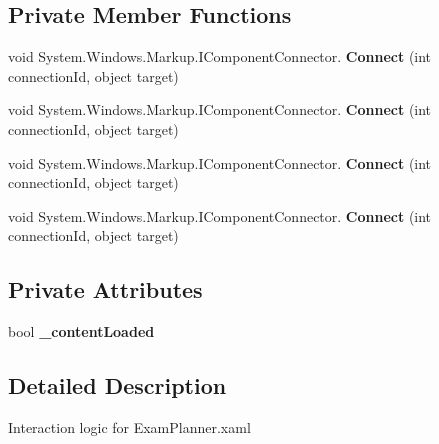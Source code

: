 \subsection*{Private Member Functions}
\begin{DoxyCompactItemize}
\item 
\mbox{\label{class_t_h_b___plugin___exams_1_1_exams_planner_1_1_page_aafa44a3d35e97d6ec9bc6c365ce75790}} 
void System.\+Windows.\+Markup.\+I\+Component\+Connector. {\bfseries Connect} (int connection\+Id, object target)
\item 
\mbox{\label{class_t_h_b___plugin___exams_1_1_exams_planner_1_1_page_aafa44a3d35e97d6ec9bc6c365ce75790}} 
void System.\+Windows.\+Markup.\+I\+Component\+Connector. {\bfseries Connect} (int connection\+Id, object target)
\item 
\mbox{\label{class_t_h_b___plugin___exams_1_1_exams_planner_1_1_page_aafa44a3d35e97d6ec9bc6c365ce75790}} 
void System.\+Windows.\+Markup.\+I\+Component\+Connector. {\bfseries Connect} (int connection\+Id, object target)
\item 
\mbox{\label{class_t_h_b___plugin___exams_1_1_exams_planner_1_1_page_aafa44a3d35e97d6ec9bc6c365ce75790}} 
void System.\+Windows.\+Markup.\+I\+Component\+Connector. {\bfseries Connect} (int connection\+Id, object target)
\end{DoxyCompactItemize}
\subsection*{Private Attributes}
\begin{DoxyCompactItemize}
\item 
\mbox{\label{class_t_h_b___plugin___exams_1_1_exams_planner_1_1_page_ade9b31d7bc75118e5c0ee2521803cefa}} 
bool {\bfseries \+\_\+content\+Loaded}
\end{DoxyCompactItemize}


\subsection{Detailed Description}
Interaction logic for Exam\+Planner.\+xaml 

